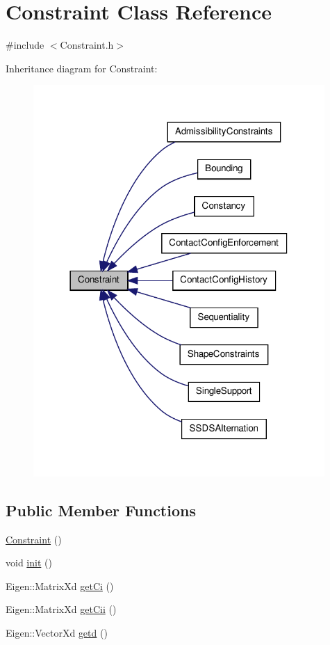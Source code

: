 \hypertarget{classConstraint}{\section{\-Constraint \-Class \-Reference}
\label{classConstraint}
}


{\ttfamily \#include $<$\-Constraint.\-h$>$}



\-Inheritance diagram for \-Constraint\-:\nopagebreak
\begin{figure}[H]
\begin{center}
\leavevmode
\includegraphics[width=314pt]{classConstraint__inherit__graph}
\end{center}
\end{figure}
\subsection*{\-Public \-Member \-Functions}
\begin{DoxyCompactItemize}
\item 
\hyperlink{classConstraint_ac066210c674e540f0d2570f53d6eff7b}{\-Constraint} ()
\item 
void \hyperlink{classConstraint_a0a4e0b4478205ba856dafe514d03eba4}{init} ()
\item 
\-Eigen\-::\-Matrix\-Xd \hyperlink{classConstraint_a9617822e8e1145177f41775748810ef6}{get\-Ci} ()
\item 
\-Eigen\-::\-Matrix\-Xd \hyperlink{classConstraint_abc5587e865eebb1ac924ce06e982117e}{get\-Cii} ()
\item 
\-Eigen\-::\-Vector\-Xd \hyperlink{classConstraint_a6498cc7d4a96baa9158c6e38384364d5}{getd} ()
\end{DoxyCompactItemize}
